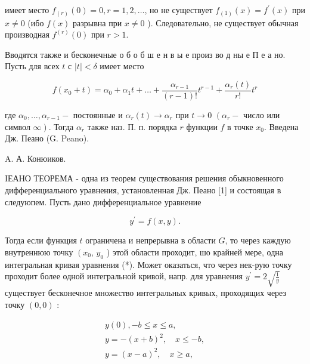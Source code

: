 \documentclass[10pt]{article}
\begin{document}
имеет место $f_{(r)}(0)=0, r=1,2, \ldots$, но не существует $f_{(1)}(x)=f^{\prime}(x)$ при $x \neq 0$ (ибо $f(x)$ разрывна при $x \neq 0$ ). Следовательно, не существует обычная производная $f^{(r)}(0)$ при $r>1$.



Вводятся также и бесконечные о б о б ш е н в ы $е$ произ во д ны е П е а но. Пусть для всех $t$ с $|t|<\delta$ имеет место



\[

f\left(x_{0}+t\right)=\alpha_{0}+\alpha_{1} t+\ldots+\frac{\alpha_{r-1}}{(r-1) !} t^{r-1}+\frac{\alpha_{r}(t)}{r !} t^{r}

\]



где $\alpha_{0}, \ldots, \alpha_{r-1}-$ постоянные и $\alpha_{r}(t) \rightarrow \alpha_{r}$ при $t \rightarrow 0$ $\left(\alpha_{r}-\right.$ число или символ $\left.\infty\right)$. Тогда $\alpha_{r}$ также наз. П. п. порядка $r$ функции $f$ в точке $x_{0}$. Введена Дж. Пеано (G. Peano).



A. А. Конюиков.



IЕАНО ТЕОРЕМА - одна из теорем существования решения обыкновенного дифференциального уравнения, установленная Дж. Пеано [1] и состоящая в следуюпем. Пусть дано дифференциальное уравнение



\[

y^{\prime}=f(x, y) .

\]



Тогда если функция $t$ ограничена и непрерывна в области $G$, то через каждую внутреннюю точку $\left(x_{0}\right.$, $y_{0}$ ) этой области проходит, шо крайней мере, одна интегральная кривая уравнения (*). Может оказаться, что через нек-рую точку проходит более одной интегральной кривой, напр. для уравнения $y^{\prime}=2 \sqrt{\frac{1}{y}}$ существует бесконечное множество интегральных кривых, проходящих через точку $(0,0)$ :



\[

\begin{gathered}

y(0),-b \leqslant x \leqslant a, \\

y=-(x+b)^{2}, \quad x \leqslant-b, \\

y=(x-a)^{2}, \quad x \geqslant a,

\end{gathered}

\]
\end{document}
